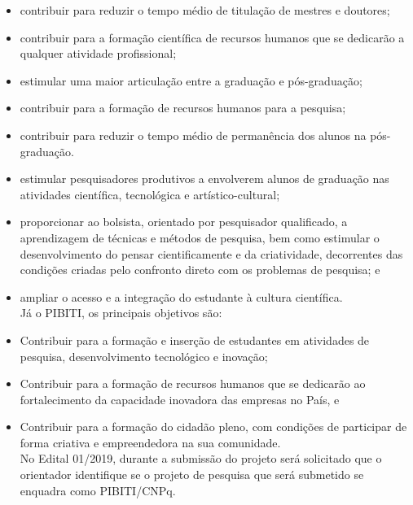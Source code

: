 \documentclass[a4paper,12pt]{article}
\begin{document}
{\begin{itemize}
    \item contribuir para reduzir o tempo médio de titulação de mestres e doutores;

    \item contribuir para a formação científica de recursos humanos que se dedicarão a qualquer atividade profissional;
    \item estimular uma maior articulação entre a graduação e pós-graduação;

    \item contribuir para a formação de recursos humanos para a pesquisa;

    \item contribuir para reduzir o tempo médio de permanência dos alunos na pós-graduação.

    \item estimular pesquisadores produtivos a envolverem alunos de graduação nas atividades científica, tecnológica e artístico-cultural;

    \item proporcionar ao bolsista, orientado por pesquisador qualificado, a aprendizagem de técnicas e métodos de pesquisa, bem como estimular o desenvolvimento do pensar cientificamente e da criatividade, decorrentes das condições criadas pelo confronto direto com os problemas de pesquisa; e

    \item ampliar o acesso e a integração do estudante à cultura científica.\\
    
Já o PIBITI, os principais objetivos são:\\

    \item Contribuir para a formação e inserção de estudantes em atividades de pesquisa, desenvolvimento tecnológico e inovação;

    \item Contribuir para a formação de recursos humanos que se dedicarão ao fortalecimento da capacidade inovadora das empresas no País, e
    \item Contribuir para a formação do cidadão pleno, com condições de participar de forma criativa e empreendedora na sua comunidade.\\
    
No Edital 01/2019, durante a submissão do projeto será solicitado que o orientador identifique se o projeto de pesquisa que será submetido se enquadra como PIBITI/CNPq. \cite{Cho:2017ufy}


\end{itemize}}
\end{document}
